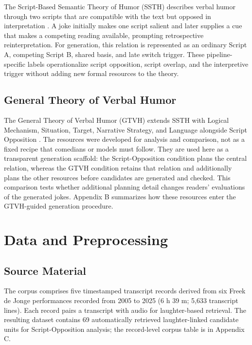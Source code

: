 \documentclass[11pt]{article}
\begin{document}
The Script-Based Semantic Theory of Humor (SSTH) describes verbal humor through two scripts that are compatible with the text but opposed in interpretation \citep{raskin1985}. A joke initially makes one script salient and later supplies a cue that makes a competing reading available, prompting retrospective reinterpretation. For generation, this relation is represented as an ordinary Script A, competing Script B, shared basis, and late switch trigger. These pipeline-specific labels operationalize script opposition, script overlap, and the interpretive trigger without adding new formal resources to the theory.

\subsection{General Theory of Verbal Humor}\label{general-theory-of-verbal-humor}

The General Theory of Verbal Humor (GTVH) extends SSTH with Logical Mechanism, Situation, Target, Narrative Strategy, and Language alongside Script Opposition \citep{attardo1991}. The resources were developed for analysis and comparison, not as a fixed recipe that comedians or models must follow. They are used here as a transparent generation scaffold: the Script-Opposition condition plans the central relation, whereas the GTVH condition retains that relation and additionally plans the other resources before candidates are generated and checked. This comparison tests whether additional planning detail changes readers' evaluations of the generated jokes. Appendix B summarizes how these resources enter the GTVH-guided generation procedure.

\section{Data and Preprocessing}\label{data-and-preprocessing}

\subsection{Source Material}\label{source-material}

The corpus comprises five timestamped transcript records derived from six Freek de Jonge performances recorded from 2005 to 2025 (6 h 39 m; 5,633 transcript lines). Each record pairs a transcript with audio for laughter-based retrieval. The resulting dataset contains 69 automatically retrieved laughter-linked candidate units for Script-Opposition analysis; the record-level corpus table is in Appendix C.
\end{document}
